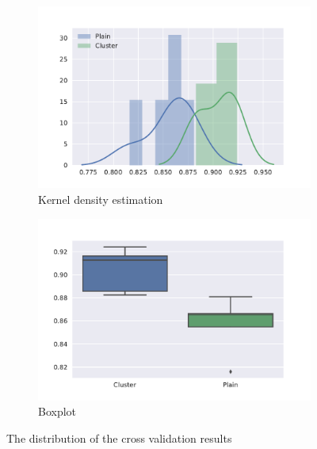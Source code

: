 \begin{figure}[htb]
  \centering
  \begin{subfigure}[b]{0.80\textwidth} 
    \centering
    \includegraphics[width=\textwidth]{figures/results/small_5_fold_kde.pdf}
    \caption{Kernel density estimation}
  \end{subfigure}
  \vspace{0.10\textwidth}
  \begin{subfigure}[b]{0.80\textwidth}
	\centering
    \includegraphics[width=\textwidth]{figures/results/small_5_fold_boxplot.pdf}
    \caption{Boxplot}
  \end{subfigure}
  \caption{The distribution of the cross validation results}
  \label{fig:small_dist}
\end{figure}


